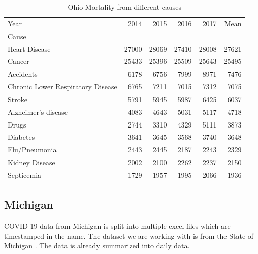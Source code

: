 \documentclass[conference]{IEEEtran}
\begin{document}
\begin{table}
  \centering
\begin{tabular}{lrrrrr}
\toprule
Year &   2014 &   2015 &   2016 &   2017 &   Mean \\
Cause                             &        &        &        &        &        \\
\midrule
Heart Disease                     &  27000 &  28069 &  27410 &  28008 &  27621 \\
Cancer                            &  25433 &  25396 &  25509 &  25643 &  25495 \\
Accidents                         &   6178 &   6756 &   7999 &   8971 &   7476 \\
Chronic Lower Respiratory Disease &   6765 &   7211 &   7015 &   7312 &   7075 \\
Stroke                            &   5791 &   5945 &   5987 &   6425 &   6037 \\
Alzheimer’s disease               &   4083 &   4643 &   5031 &   5117 &   4718 \\
Drugs                             &   2744 &   3310 &   4329 &   5111 &   3873 \\
Diabetes                          &   3641 &   3645 &   3568 &   3740 &   3648 \\
Flu/Pneumonia                     &   2443 &   2445 &   2187 &   2243 &   2329 \\
Kidney Disease                    &   2002 &   2100 &   2262 &   2237 &   2150 \\
Septicemia                        &   1729 &   1957 &   1995 &   2066 &   1936 \\
\bottomrule
\end{tabular}
\caption{Ohio Mortality from different causes \label{tab:mortalityStats}}
\end{table}

\subsection{Michigan}

COVID-19 data from Michigan is split into multiple excel files which are timestamped in the name.
The dataset we are working with is from the State of Michigan \cite{noauthor_coronavirus_nodate}.
The data is already summarized into daily data.
\end{document}
